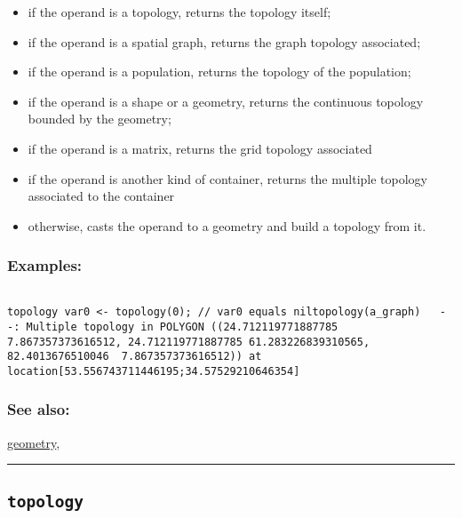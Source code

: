 \documentclass[]{book}
\providecommand{\tightlist}{%
  \setlength{\itemsep}{0pt}\setlength{\parskip}{0pt}}
\theoremstyle{definition}
\theoremstyle{definition}
\theoremstyle{definition}
\theoremstyle{remark}
\begin{document}
\begin{itemize}
\tightlist
\item
  if the operand is a topology, returns the topology itself;\\
\item
  if the operand is a spatial graph, returns the graph topology
  associated;\\
\item
  if the operand is a population, returns the topology of the
  population;\\
\item
  if the operand is a shape or a geometry, returns the continuous
  topology bounded by the geometry;\\
\item
  if the operand is a matrix, returns the grid topology associated\\
\item
  if the operand is another kind of container, returns the multiple
  topology associated to the container\\
\item
  otherwise, casts the operand to a geometry and build a topology from
  it.
\end{itemize}

\subsubsection{Examples:}\label{examples-363}

\begin{verbatim}
 
topology var0 <- topology(0); // var0 equals niltopology(a_graph)   --: Multiple topology in POLYGON ((24.712119771887785 7.867357373616512, 24.712119771887785 61.283226839310565, 82.4013676510046  7.867357373616512)) at location[53.556743711446195;34.57529210646354] 
\end{verbatim}

\subsubsection{See also:}\label{see-also-206}

\href{OperatorsDH\#geometry}{geometry},

\begin{center}\rule{0.5\linewidth}{\linethickness}\end{center}

\subsection{\texorpdfstring{\texttt{topology}}{topology}}\label{topology-1}
\end{document}
